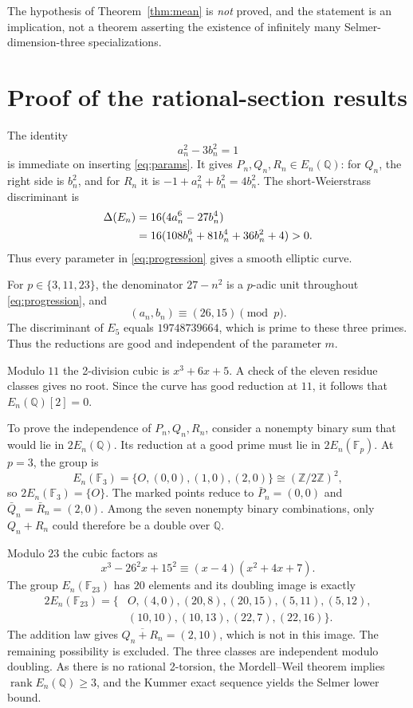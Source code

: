 \documentclass[11pt]{article}
\newcommand{\Q}{\mathbb Q}
\newcommand{\F}{\mathbb F}
\newcommand{\rank}{\operatorname{rank}}
\begin{document}
The hypothesis of Theorem~\ref{thm:mean} is \emph{not} proved,
and the statement is an implication, not a theorem asserting the
existence of infinitely many Selmer-dimension-three specializations.

\section{Proof of the rational-section results}

The identity
\begin{equation}\label{eq:pell}
 a_n^2-3b_n^2=1
\end{equation}
is immediate on inserting \eqref{eq:params}.
It gives $P_n,Q_n,R_n\in E_n(\Q)$:
for $Q_n$, the right side is $b_n^2$, and for $R_n$ it
is $-1+a_n^2+b_n^2=4b_n^2$.
The short-Weierstrass discriminant is
\begin{align}
 \Delta(E_n)
 &=16(4a_n^6-27b_n^4)\notag\\
 &=16(108b_n^6+81b_n^4+36b_n^2+4)>0.\label{eq:delta}
\end{align}
Thus every parameter in \eqref{eq:progression} gives a smooth
elliptic curve.

For $p\in\{3,11,23\}$, the denominator $27-n^2$ is a $p$-adic
unit throughout \eqref{eq:progression}, and
\[
 (a_n,b_n)\equiv(26,15)\pmod p.
\]
The discriminant of $E_5$ equals $19748739664$, which is prime
to these three primes. Thus the reductions are good and independent
of the parameter $m$.

Modulo $11$ the 2-division cubic is $x^3+6x+5$. A check of
the eleven residue classes gives no root. Since the curve has
good reduction at $11$, it follows that $E_n(\Q)[2]=0$.

To prove the independence of $P_n,Q_n,R_n$, consider a nonempty
binary sum that would lie in $2E_n(\Q)$. Its reduction at a good
prime must lie in $2E_n(\F_p)$.
At $p=3$, the group is
\[
 E_n(\F_3)=\{O,(0,0),(1,0),(2,0)\}
 \cong(\mathbb Z/2\mathbb Z)^2,
\]
so $2E_n(\F_3)=\{O\}$. The marked points reduce to
$\bar P_n=(0,0)$ and $\bar Q_n=\bar R_n=(2,0)$.
Among the seven nonempty binary combinations,
only $Q_n+R_n$ could therefore be a double over $\Q$.

Modulo $23$ the cubic factors as
\[
 x^3-26^2x+15^2\equiv(x-4)(x^2+4x+7).
\]
The group $E_n(\F_{23})$ has $20$ elements and its doubling
image is exactly
\begin{align*}
 2E_n(\F_{23})=\{&
 O,(4,0),(20,8),(20,15),(5,11),(5,12),\\
 &(10,10),(10,13),(22,7),(22,16)\}.
\end{align*}
The addition law gives $\overline{Q_n+R_n}=(2,10)$, which
is not in this image. The remaining possibility is excluded.
The three classes are independent modulo doubling.
As there is no rational 2-torsion, the Mordell--Weil theorem
implies $\rank E_n(\Q)\ge3$, and the Kummer exact sequence yields
the Selmer lower bound.
\end{document}
